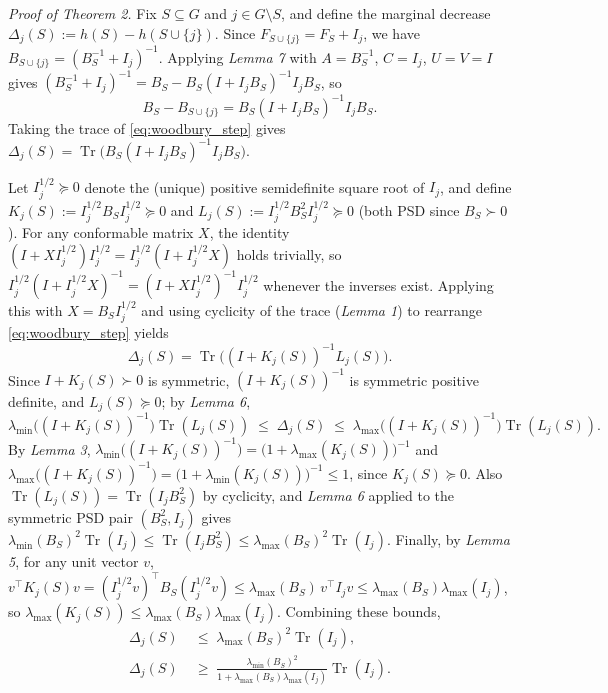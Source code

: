 \documentclass[letterpaper, 10 pt, conference]{ieeeconf}  %
\begin{document}
\noindent \textit{Proof of Theorem 2.}
Fix \(S\subseteq G\) and \(j\in G\setminus S\), and define the marginal decrease $\Delta_j(S):=h(S)-h(S\cup\{j\})$. Since $F_{S\cup\{j\}}=F_S+I_j$, we have $B_{S\cup\{j\}}=(B_S^{-1}+I_j)^{-1}$. Applying \textit{Lemma 7} with $A=B_S^{-1}$, $C=I_j$, $U=V=I$ gives
$(B_S^{-1}+I_j)^{-1}=B_S-B_S(I+I_jB_S)^{-1}I_jB_S$, so
\begin{equation}
\label{eq:woodbury_step}
B_S-B_{S\cup\{j\}}=B_S(I+I_jB_S)^{-1}I_jB_S.
\end{equation}
Taking the trace of \eqref{eq:woodbury_step} gives $\Delta_j(S)=\operatorname{Tr}\big(B_S(I+I_jB_S)^{-1}I_jB_S\big)$.

Let $I_j^{1/2}\succeq 0$ denote the (unique) positive semidefinite square root of $I_j$, and define
$K_j(S):=I_j^{1/2}B_SI_j^{1/2}\succeq 0$ and $L_j(S):=I_j^{1/2}B_S^2I_j^{1/2}\succeq 0$ (both PSD since $B_S\succ 0$). For any conformable matrix $X$, the identity $(I+XI_j^{1/2})I_j^{1/2}=I_j^{1/2}(I+I_j^{1/2}X)$ holds trivially, so $I_j^{1/2}(I+I_j^{1/2}X)^{-1}=(I+XI_j^{1/2})^{-1}I_j^{1/2}$ whenever the inverses exist. Applying this with $X=B_SI_j^{1/2}$ and using cyclicity of the trace (\textit{Lemma 1}) to rearrange \eqref{eq:woodbury_step} yields
\begin{equation}
\label{eq:delta_sym}
\Delta_j(S)=\operatorname{Tr}\big((I+K_j(S))^{-1}L_j(S)\big).
\end{equation}
Since $I+K_j(S)\succ 0$ is symmetric, $(I+K_j(S))^{-1}$ is symmetric positive definite, and $L_j(S)\succeq 0$; by \textit{Lemma 6},
\[
\lambda_{\min}\!\big((I+K_j(S))^{-1}\big)\operatorname{Tr}(L_j(S))
\;\le\;
\Delta_j(S)
\;\le\;
\lambda_{\max}\!\big((I+K_j(S))^{-1}\big)\operatorname{Tr}(L_j(S)).
\]
By \textit{Lemma 3}, $\lambda_{\min}\big((I+K_j(S))^{-1}\big)=\big(1+\lambda_{\max}(K_j(S))\big)^{-1}$ and $\lambda_{\max}\big((I+K_j(S))^{-1}\big)=\big(1+\lambda_{\min}(K_j(S))\big)^{-1}\le 1$, since $K_j(S)\succeq 0$. Also $\operatorname{Tr}(L_j(S))=\operatorname{Tr}(I_jB_S^2)$ by cyclicity, and \textit{Lemma 6} applied to the symmetric PSD pair $(B_S^2,I_j)$ gives $\lambda_{\min}(B_S)^2\operatorname{Tr}(I_j)\le\operatorname{Tr}(I_jB_S^2)\le\lambda_{\max}(B_S)^2\operatorname{Tr}(I_j)$. Finally, by \textit{Lemma 5}, for any unit vector $v$, $v^\top K_j(S) v=(I_j^{1/2}v)^\top B_S(I_j^{1/2}v)\le\lambda_{\max}(B_S)\,v^\top I_j v\le \lambda_{\max}(B_S)\lambda_{\max}(I_j)$, so $\lambda_{\max}(K_j(S))\le\lambda_{\max}(B_S)\lambda_{\max}(I_j)$. Combining these bounds,
\begin{align}
\Delta_j(S) &\;\le\; \lambda_{\max}(B_S)^2\operatorname{Tr}(I_j), \label{eq:delta_upper}\\
\Delta_j(S) &\;\ge\; \frac{\lambda_{\min}(B_S)^2}{1+\lambda_{\max}(B_S)\lambda_{\max}(I_j)}\operatorname{Tr}(I_j). \label{eq:delta_lower}
\end{align}
\end{document}
